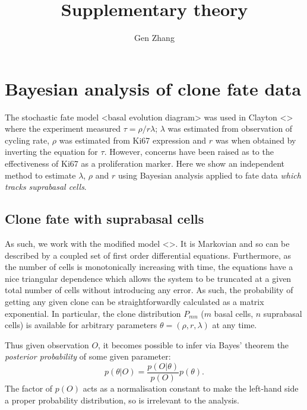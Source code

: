 \documentclass[10pt,UKenglish]{article}
\begin{document}
\title{Supplementary theory}
\author{Gen Zhang}
 
\maketitle

\section{Bayesian analysis of clone fate data}

The stochastic fate model <basal evolution diagram> was used in Clayton <> where the experiment measured $\tau = \rho/r\lambda$; $\lambda$ was estimated from observation of cycling rate, $\rho$ was estimated from Ki67 expression and $r$ was when obtained by inverting the equation for $\tau$. However, concerns have been raised as to the effectiveness of Ki67 as a proliferation marker. Here we show an independent method to estimate $\lambda$, $\rho$ and $r$ using Bayesian analysis applied to fate data \emph{which tracks suprabasal cells}.

\subsection{Clone fate with suprabasal cells}

As such, we work with the modified model <>. It is Markovian and so can be described by a coupled set of first order differential equations. Furthermore, as the number of cells is monotonically increasing with time, the equations have a nice triangular dependence which allows the system to be truncated at a given total number of cells without introducing any error. As such, the probability of getting any given clone can be straightforwardly calculated as a matrix exponential. In particular, the clone distribution $P_{mn}$ ($m$ basal cells, $n$ suprabasal cells) is available for arbitrary parameters $\theta = (\rho, r, \lambda)$ at any time.

Thus given observation $O$, it becomes possible to infer via Bayes' theorem the \emph{posterior probability} of some given parameter: $$p(\theta|O) = \frac{p(O|\theta)}{p(O)} p(\theta).$$ The factor of $p(O)$ acts as a normalisation constant to make the left-hand side a proper probability distribution, so is irrelevant to the analysis. 
\end{document}
